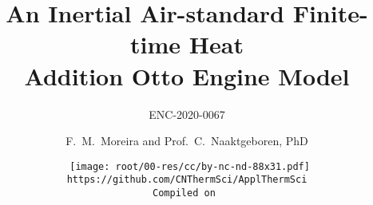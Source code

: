 \makeatletter
\immediate{} %
\makeatother



\newcommand{\VPMS}{{\ensuremath V_{\mathrm{PMS}}}}
\newcommand{\VPMI}{{\ensuremath V_{\mathrm{PMI}}}}
\newcommand{\bsans}[1]{{\ensuremath\pmb{\mathsf{#1}}}}
\title{An Inertial Air-standard Finite-time Heat\\ Addition Otto Engine Model}
\subtitle{ENC-2020-0067}
\author{F.~M.~Moreira and Prof.~C.~Naaktgeboren, PhD}
\date{{\scriptsize\tt%
    \texttt{[image: root/00-res/cc/by-nc-nd-88x31.pdf]}\\[\smallskipamount]
    https://github.com/CNThermSci/ApplThermSci\\
    Compiled on 
}}

\frame{\titlepage}
\frame{\tableofcontents}

